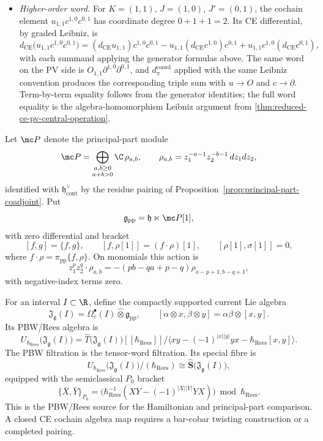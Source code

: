 \documentclass[11pt]{memoir}
\begin{document}
\begin{ex}
\begin{itemize}
    \item \emph{Higher-order word.} For $K=(1,1)$, $J=(1,0)$,
      $J'=(0,1)$, the cochain element $u_{1,1}c^{1,0}c^{0,1}$ has
      coordinate degree $0+1+1=2$. Its CE differential, by graded Leibniz, is
      $$d_{\mathrm{CE}}\bigl(u_{1,1}c^{1,0}c^{0,1}\bigr)
        =(d_{\mathrm{CE}}u_{1,1})c^{1,0}c^{0,1}
        -u_{1,1}(d_{\mathrm{CE}}c^{1,0})c^{0,1}
        +u_{1,1}c^{1,0}(d_{\mathrm{CE}}c^{0,1}),$$
      with each summand applying the generator formulas above. The
      same word on the PV side is $O_{1,1}\partial^{1,0}\partial^{0,1}$,
	      and \(d_\pi^{\mathrm{coord}}\) applied with the same Leibniz convention produces
      the corresponding triple sum with $u\to O$ and $c\to\partial$.
      Term-by-term equality follows from the generator identities; the
      full word equality is the algebra-homomorphism Leibniz argument
      from \ref{thm:reduced-ce-pv-central-operation}.
  \end{itemize}
\end{ex}

\begin{constr}\label{constr:compact-current-pbw-rees-source}
  Let $\mc P$ denote the principal-part module
  $$\mc P=\bigoplus_{\substack{a,b\geq0\\ a+b>0}}\C\,\rho_{a,b},\qquad
    \rho_{a,b}=z_1^{-a-1}z_2^{-b-1}\,dz_1dz_2,$$
  identified with $\mathfrak h^\vee_{\mathrm{cont}}$ by the residue pairing
  of Proposition~\ref{prop:principal-part-coadjoint}. Put
  $$\mathfrak g_{\mathrm{pp}}=\mathfrak h\ltimes\mc P[1],$$
  with zero differential and bracket
  $$[f,g]=\{f,g\},\qquad [f,\rho[1]]=(f\cdot\rho)[1],\qquad
    [\rho[1],\sigma[1]]=0,$$
  where $f\cdot\rho=\pi_{\mathrm{pp}}\{f,\rho\}$. On monomials this action is
  $$z_1^pz_2^q\cdot\rho_{a,b}
    =-(pb-qa+p-q)\rho_{a-p+1,b-q+1},$$
  with negative-index terms zero.

  For an interval $I\subset\R$, define the compactly supported current Lie
  algebra
  $$\mathfrak J_{\mathfrak g}(I)
    =\Omega_c^\bullet(I)\widehat\otimes\mathfrak g_{\mathrm{pp}},\qquad
    [\alpha\otimes x,\beta\otimes y]
      =\alpha\beta\otimes[x,y].$$
  Its PBW/Rees algebra is
  $$U_{\hbar_{\mathrm{Rees}}}\bigl(\mathfrak J_{\mathfrak g}(I)\bigr)
    =\widehat T\bigl(\mathfrak J_{\mathfrak g}(I)\bigr)[[\hbar_{\mathrm{Rees}}]]
      \big/
      \langle xy-(-1)^{|x||y|}yx-\hbar_{\mathrm{Rees}}[x,y]\rangle.$$
  The PBW filtration is the tensor-word filtration. Its special fibre is
  $$U_{\hbar_{\mathrm{Rees}}}\bigl(\mathfrak J_{\mathfrak g}(I)\bigr)/
    (\hbar_{\mathrm{Rees}})
    \cong \widehat{\mathbf S}\bigl(\mathfrak J_{\mathfrak g}(I)\bigr),$$
  equipped with the semiclassical $P_0$ bracket
  $$\{\bar X,\bar Y\}_{P_0}
    =\bigl(\hbar_{\mathrm{Rees}}^{-1}
      (XY-(-1)^{|X||Y|}YX)\bigr)\bmod\hbar_{\mathrm{Rees}}.$$
  This is the PBW/Rees source for the Hamiltonian and principal-part
  comparison.  A closed CE cochain algebra map requires a bar-cobar
  twisting construction or a completed pairing.
\end{constr}
\end{document}
